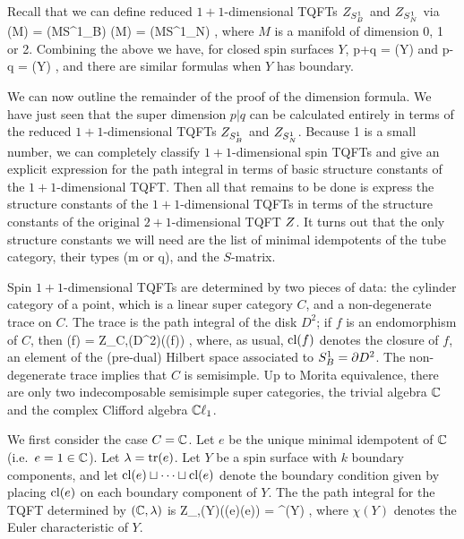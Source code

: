 \medskip

Recall that we can define reduced $1{+}1$-dimensional TQFTs $Z_{S^1_B}$ and $Z_{S^1_N}$ via
\be
	\zob(M) = \ztt(M\times S^1_B) \quad\quad \zon(M) = \ztt(M\times S^1_N) ,
\ee
where $M$ is a manifold of dimension 0, 1 or 2.
Combining the above we have, for closed spin surfaces $Y$,
\be  \label{df5}
	p+q = \zob(Y)
\ee
and
\be  \label{df6}
	p-q = \zon(Y) ,
\ee
and there are similar formulas when $Y$ has boundary.

\medskip

We can now outline the remainder of the proof of the dimension formula.
We have just seen that the super dimension $p|q$ can be calculated entirely in terms of the reduced 
$1{+}1$-dimensional TQFTs $Z_{S^1_B}$ and $Z_{S^1_N}$.
Because 1 is a small number, we can completely classify $1{+}1$-dimensional spin TQFTs and give an explicit
expression for the path integral in terms of basic structure constants of the $1{+}1$-dimensional TQFT.
Then all that remains to be done is express the structure constants of the $1{+}1$-dimensional TQFTs in terms
of the structure constants of the original $2{+}1$-dimensional TQFT $Z$.
It turns out that the only structure constants we will need are the list of minimal idempotents of the tube category, 
their types (m or q), and the $S$-matrix.

\medskip

Spin $1{+}1$-dimensional TQFTs are determined by two pieces of data:
the cylinder category of a point, which is a linear super category $C$,
and a non-degenerate trace on $C$.
The trace is the path integral of the disk $D^2$; if $f$ is an endomorphism of $C$, then
\be
	\tr(f) = Z_{C,\tr}(D^2)(\cl(f)) ,
\ee
where, as usual, $\text{cl}(f)$ denotes the closure of $f$, an element of the (pre-dual) Hilbert space associated to $S^1_B = \partial D^2$.
The non-degenerate trace implies that $C$ is semisimple.
Up to Morita equivalence, there are only two indecomposable semisimple super categories, the 
trivial algebra $\mathbb{C}$ and the complex Clifford algebra $\mathbb{C}\ell_1$.

We first consider the case $C = \mathbb{C}$.
Let $e$ be the unique minimal idempotent of $\mathbb{C}$ (i.e.\ $e = 1\in \mathbb{C}$).
Let $\lambda = \text{tr}(e)$.
Let $Y$ be a spin surface with $k$ boundary components, and let
$\text{cl}(e)\sqcup\cdots\sqcup \text{cl}(e)$ denote the boundary condition given by placing $\text{cl}(e)$ on each boundary component of $Y$.
The the path integral for the TQFT determined by $(\mathbb{C}, \lambda)$ is
\be  \label{zc_ans}
	Z_{\cc,\lambda}(Y)(\cl(e)\du\cdots\du \cl(e)) = \lambda^{\chi(Y)} ,
\ee
where $\chi(Y)$ denotes the Euler characteristic of $Y$.

